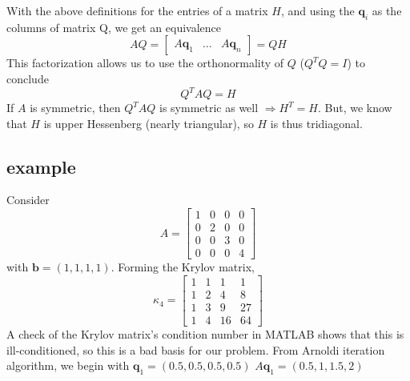 \documentclass[11pt]{article}
\newcommand{\norm}[1]{\left|\left|#1\right|\right|}
\begin{document}
\begin{algorithm}
\begin{algorithmic}[1]
  \EndFor
	\State{$h_{i+1,j} = \norm{t} $}
 \EndFor
\end{algorithmic}
\end{algorithm}
With the above definitions for the entries of a matrix $H$, and using the $\mathbf{q}_i$ as the columns of matrix Q, we get an equivalence
$$AQ = \begin{bmatrix} A\mathbf{q}_1 & \ldots & A\mathbf{q}_n \end{bmatrix} = QH$$
This factorization allows us to use the orthonormality of $Q$ ($Q^TQ = I$) to conclude
$$Q^TAQ = H$$
If $A$ is symmetric, then $Q^TAQ$ is symmetric as well $\Rightarrow H^T=H$.
But, we know that $H$ is upper Hessenberg (nearly triangular), so $H$ is thus tridiagonal. 

\subsection{example}
Consider 
$$A = \begin{bmatrix} 1 & 0  & 0 & 0 \\  0 & 2  & 0 & 0 \\  0 & 0  & 3 & 0 \\  0 & 0  & 0 & 4 \end{bmatrix} $$
with $\mathbf{b} = (1,1,1,1)$. Forming the Krylov matrix,
$$\kappa_4 = \begin{bmatrix} 1 & 1  & 1 & 1 \\  1 & 2  & 4 & 8 \\  1 & 3  & 9 & 27 \\  1 & 4  & 16 & 64 \end{bmatrix} $$
A check of the Krylov matrix's condition number in MATLAB shows that this is ill-conditioned, so this is a bad basis for our problem. From Arnoldi iteration algorithm, we begin with 
$\mathbf{q}_1 = (0.5,0.5,0.5,0.5)$
$A\mathbf{q}_1 = (0.5,1,1.5,2)$
\end{document}
